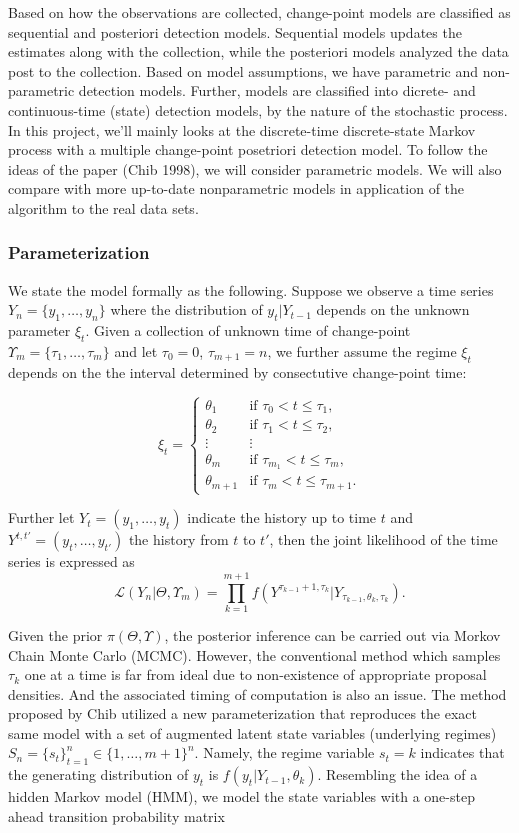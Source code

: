 \documentclass{article}
\begin{document}
Based on how the observations are collected, change-point models are
classified as sequential and posteriori detection models. Sequential
models updates the estimates along with the collection, while the
posteriori models analyzed the data post to the collection. Based on
model assumptions, we have parametric and non-parametric detection
models. Further, models are classified into dicrete- and continuous-time
(state) detection models, by the nature of the stochastic process. In
this project, we'll mainly looks at the discrete-time discrete-state
Markov process with a multiple change-point posetriori detection model.
To follow the ideas of the paper (Chib 1998), we will consider
parametric models. We will also compare with more up-to-date
nonparametric models in application of the algorithm to the real data
sets.

\subsubsection{Parameterization}\label{parameterization}

We state the model formally as the following. Suppose we observe a time
series $Y_n=\{y_1,\ldots,y_n\}$ where the distribution of $y_t|Y_{t-1}$
depends on the unknown parameter $\xi_t$. Given a collection of unknown
time of change-point $\Upsilon_m=\{\tau_1,\ldots,\tau_m\}$ and let
$\tau_0=0$, $\tau_{m+1}=n$, we further assume the regime $\xi_t$ depends
on the the interval determined by consectutive change-point time:

\[\xi_t=\begin{cases} \theta_1 &\mbox{if } \tau_0 < t \leq \tau_1, \\ 
\theta_2 &\mbox{if } \tau_1 < t \leq \tau_2,\\
\vdots &\vdots\\
\theta_m &\mbox{if } \tau_{m_1} < t \leq \tau_m,\\
\theta_{m+1} &\mbox{if } \tau_{m} < t \leq \tau_{m+1}. \end{cases}\]

Further let $Y_t=(y_1,\ldots,y_t)$ indicate the history up to time $t$
and $Y^{t,t'}=(y_t,\ldots,y_{t'})$ the history from $t$ to $t'$, then
the joint likelihood of the time series is expressed as
\[\mathcal{L}(Y_n|\Theta,\Upsilon_m)=\prod_{k=1}^{m+1}f(Y^{\tau_{k-1}+1,\tau_k}|Y_{\tau_{k-1},\theta_k,\tau_k}).\]

Given the prior $\pi(\Theta,\Upsilon)$, the posterior inference can be
carried out via Morkov Chain Monte Carlo (MCMC). However, the
conventional method which samples $\tau_k$ one at a time is far from
ideal due to non-existence of appropriate proposal densities. And the
associated timing of computation is also an issue. The method proposed
by Chib utilized a new parameterization that reproduces the exact same
model with a set of augmented latent state variables (underlying
regimes) $S_n=\{s_t\}_{t=1}^n\in\{1,\ldots,m+1\}^n$. Namely, the regime
variable $s_t=k$ indicates that the generating distribution of $y_t$ is
$f(y_t|Y_{t-1},\theta_k)$. Resembling the idea of a hidden Markov model
(HMM), we model the state variables with a one-step ahead transition
probability matrix
\end{document}

